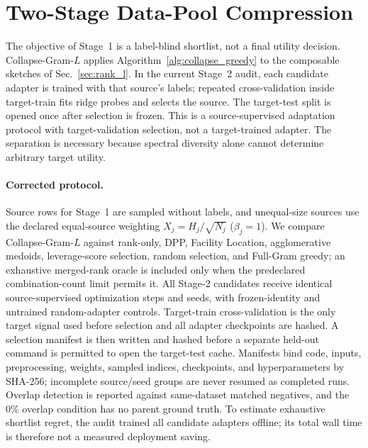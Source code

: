 \documentclass{article}
\begin{document}
\section{Two-Stage Data-Pool Compression}
\label{sec:applications}
\label{sec:compression}
\label{sec:pool_selection}

The objective of Stage~1 is a label-blind shortlist, not a final utility
decision.  Collapse-Gram-$L$ applies Algorithm~\ref{alg:collapse_greedy} to
the composable sketches of Sec.~\ref{sec:rank_l}.  In the current Stage~2
audit, each candidate adapter is trained with that source's labels; repeated
cross-validation inside target-train fits ridge probes and selects the source.
The target-test split is opened once after selection is frozen.  This is a
source-supervised adaptation protocol with target-validation selection, not a
target-trained adapter.  The separation is necessary because spectral
diversity alone cannot determine arbitrary target utility.

\paragraph{Corrected protocol.}
Source rows for Stage~1 are sampled without labels, and unequal-size sources
use the declared equal-source weighting $X_j=H_j/\sqrt{N_j}$
($\beta_j=1$).  We compare
Collapse-Gram-$L$ against rank-only, DPP, Facility Location, agglomerative
medoids, leverage-score selection, random selection, and Full-Gram greedy;
an exhaustive merged-rank oracle is included only when the predeclared
combination-count limit permits it.  All Stage-2 candidates receive
identical source-supervised optimization steps and seeds, with frozen-identity
and untrained random-adapter controls.  Target-train cross-validation is the
only target signal used before selection and all adapter checkpoints are
hashed.  A selection manifest is then written and hashed before a separate
held-out command is permitted to open the target-test cache.  Manifests bind
code, inputs, preprocessing, weights,
sampled indices, checkpoints, and hyperparameters by SHA-256; incomplete
source/seed groups are never resumed as completed runs.  Overlap detection is
reported against same-dataset matched negatives, and the $0\%$ overlap
condition has no parent ground truth.  To estimate exhaustive shortlist
regret, the audit trained all candidate adapters offline; its total wall time
is therefore not a measured deployment saving.
\end{document}
